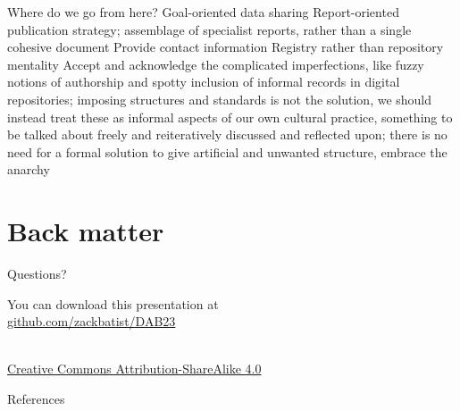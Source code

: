 \documentclass{beamer}
\begin{document}
\begin{frame}{Where do we go from here?}
  Goal-oriented data sharing
  Report-oriented publication strategy; assemblage of specialist reports, rather than a single cohesive document
  Provide contact information
  Registry rather than repository mentality
  Accept and acknowledge the complicated imperfections, like fuzzy notions of authorship and spotty inclusion of informal records in digital repositories; imposing structures and standards is not the solution, we should instead treat these as informal aspects of our own cultural practice, something to be talked about freely and reiteratively discussed and reflected upon; there is no need for a formal solution to give artificial and unwanted structure, embrace the anarchy


\end{frame}

\section*{Back matter}

\begin{frame}[standout]
  Questions?
\end{frame}

\begin{frame}
  
\begin{center}You can download this presentation at\\
\url{github.com/zackbatist/DAB23}\end{center}

\begin{center}\doclicenseImage[imagewidth=2cm]\\
\footnotesize \href{http://creativecommons.org/licenses/by-sa/4.0/}{Creative Commons Attribution-ShareAlike 4.0}\end{center}



\end{frame}

\begin{frame}{References}
  
  
\end{frame}
\end{document}
